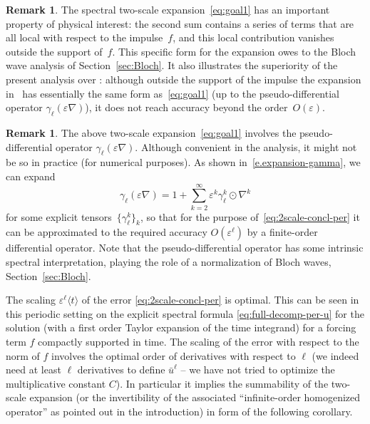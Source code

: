 \documentclass[10pt]{amsart}
\theoremstyle{plain}
\theoremstyle{definition}
\newtheorem{rem0}[theor0]{Remark}
\newenvironment{rem}
{\renewcommand{\qedsymbol}{$\lozenge$}\pushQED{\qed}\begin{rem0}}
{\popQED\end{rem0}}
\numberwithin{equation}{section}
\newcommand{\e}{\varepsilon}
\begin{document}
\begin{rem}\label{rem:vanish}
The spectral two-scale expansion~\eqref{eq:goal1} has an important property of physical interest: the second sum contains a series of terms that are all local with respect to the impulse~$f$, and this local contribution vanishes outside the support of~$f$.
This specific form for the expansion owes to the Bloch wave analysis of Section~\ref{sec:Bloch}.
It also illustrates the superiority of the present analysis over \cite{BG}: although outside the support of the impulse the expansion in~\cite{BG} has essentially the same form as~\eqref{eq:goal1} (up to the pseudo-differential operator $\gamma_\ell(\e\nabla)$), it does not reach accuracy beyond {the order}~$O(\e)$.
\end{rem}

\begin{rem}
The above two-scale expansion~\eqref{eq:goal1} involves the pseudo-differential operator $\gamma_\ell(\e \nabla)$. Although convenient in the analysis, it might not be so in practice (\eg for numerical purposes).
As shown in~\eqref{e.expansion-gamma}, we can expand
\[
\gamma_\ell(\e \nabla)=1+\sum_{k=2}^\infty \e^k \gamma_{\ell}^k \odot \nabla^{k}
\]
for some explicit tensors~$\{\gamma_{\ell}^k\}_k$, so that for the purpose of~\eqref{eq:2scale-concl-per} it can be approximated to the required accuracy $O(\e^\ell)$ by a finite-order differential operator. Note that the pseudo-differential operator has some intrinsic spectral interpretation, playing the role of a normalization of Bloch waves, \cf Section~\ref{sec:Bloch}.
\end{rem}

{The scaling $\e^\ell \langle t\rangle$ of the error \eqref{eq:2scale-concl-per} is optimal.
This can be seen in this periodic setting on the explicit spectral formula \eqref{eq:full-decomp-per-u} for the solution (with a first order Taylor expansion of the time integrand) for a forcing term $f$ compactly supported in time. The scaling of the error with respect to the norm of $f$ involves the optimal order of derivatives with respect to $\ell$ (we indeed need at least $\ell$ derivatives to define $\bar u^\ell$ -- we have not tried to optimize the multiplicative constant $C$). In particular it implies the summability of the two-scale expansion (or the invertibility of the associated ``infinite-order homogenized operator'' as pointed out in the introduction) in form of the following corollary.}
\end{document}
